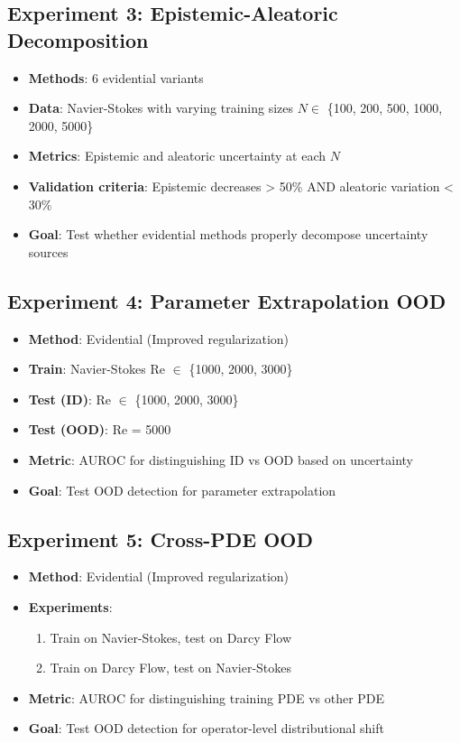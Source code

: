 \subsection{Experiment 3: Epistemic-Aleatoric Decomposition}

\begin{itemize}
\item \textbf{Methods}: 6 evidential variants
\item \textbf{Data}: Navier-Stokes with varying training sizes $N \in$ \{100, 200, 500, 1000, 2000, 5000\}
\item \textbf{Metrics}: Epistemic and aleatoric uncertainty at each $N$
\item \textbf{Validation criteria}: Epistemic decreases > 50\% AND aleatoric variation < 30\%
\item \textbf{Goal}: Test whether evidential methods properly decompose uncertainty sources
\end{itemize}

\subsection{Experiment 4: Parameter Extrapolation OOD}

\begin{itemize}
\item \textbf{Method}: Evidential (Improved regularization)
\item \textbf{Train}: Navier-Stokes Re $\in$ \{1000, 2000, 3000\}
\item \textbf{Test (ID)}: Re $\in$ \{1000, 2000, 3000\}
\item \textbf{Test (OOD)}: Re = 5000
\item \textbf{Metric}: AUROC for distinguishing ID vs OOD based on uncertainty
\item \textbf{Goal}: Test OOD detection for parameter extrapolation
\end{itemize}

\subsection{Experiment 5: Cross-PDE OOD}

\begin{itemize}
\item \textbf{Method}: Evidential (Improved regularization)
\item \textbf{Experiments}:
\begin{enumerate}
\item Train on Navier-Stokes, test on Darcy Flow
\item Train on Darcy Flow, test on Navier-Stokes
\end{enumerate}
\item \textbf{Metric}: AUROC for distinguishing training PDE vs other PDE
\item \textbf{Goal}: Test OOD detection for operator-level distributional shift
\end{itemize}

